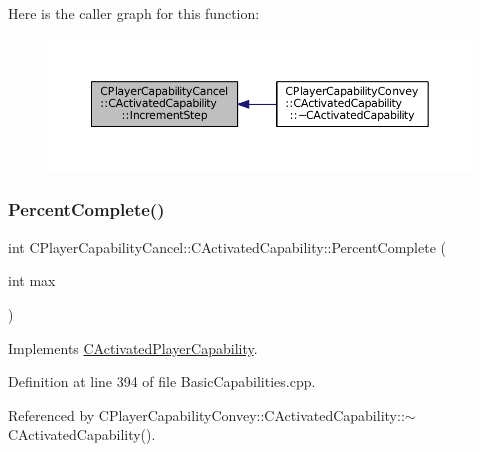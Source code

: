 Here is the caller graph for this function\+:\nopagebreak
\begin{figure}[H]
\begin{center}
\leavevmode
\includegraphics[width=350pt]{classCPlayerCapabilityCancel_1_1CActivatedCapability_a28351293b3a662bca20a2d666b8801e1_icgraph}
\end{center}
\end{figure}
\hypertarget{classCPlayerCapabilityCancel_1_1CActivatedCapability_a69d2fec27186cba11ab545560e7bf45d}{}\label{classCPlayerCapabilityCancel_1_1CActivatedCapability_a69d2fec27186cba11ab545560e7bf45d} 
\subsubsection{\texorpdfstring{Percent\+Complete()}{PercentComplete()}}
{\footnotesize\ttfamily int C\+Player\+Capability\+Cancel\+::\+C\+Activated\+Capability\+::\+Percent\+Complete (\begin{DoxyParamCaption}\item[{int}]{max }\end{DoxyParamCaption})\hspace{0.3cm}{\ttfamily [virtual]}}



Implements \hyperlink{classCActivatedPlayerCapability_a405dc6076058006a4f801727de4cfe4d}{C\+Activated\+Player\+Capability}.



Definition at line 394 of file Basic\+Capabilities.\+cpp.



Referenced by C\+Player\+Capability\+Convey\+::\+C\+Activated\+Capability\+::$\sim$\+C\+Activated\+Capability().


